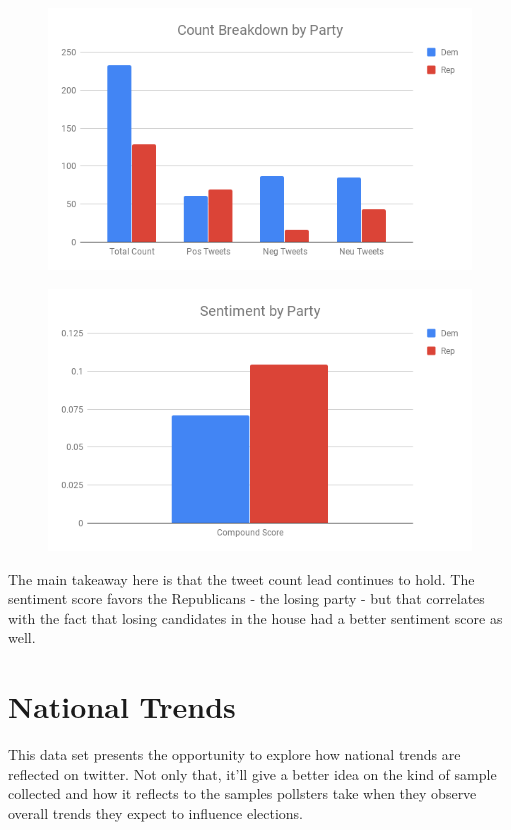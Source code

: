 \documentclass[11pt, twoside, reqno]{article}
\begin{document}
\begin{figure}[H]
	\includegraphics[scale=0.5]{count_party_house}
\end{figure}

\begin{figure}[H]
	\includegraphics[scale=0.5]{party_sent_house}
\end{figure}

The main takeaway here is that the tweet count lead continues to hold. The sentiment score favors the Republicans - the losing party - but that correlates with the fact that losing candidates in the house had a better sentiment score as well. 

\section{National Trends}
\hspace{0.2in} This data set presents the opportunity to explore how national trends are reflected on twitter. Not only that, it'll give a better idea on the kind of sample collected and how it reflects to the samples pollsters take when they observe overall trends they expect to influence elections. 
\end{document}
